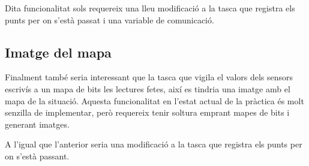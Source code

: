 Dita funcionalitat sols requereix una lleu modificació a la tasca que registra
els punts per on s'està passat i una variable de comunicació.

\subsection{Imatge del mapa}
Finalment també seria interessant que la tasca que vigila el valors dels sensors
escrivís a un mapa de bits les lectures fetes, així es tindria una imatge amb el
mapa de la situació. Aquesta funcionalitat en l'estat actual de la pràctica és
molt senzilla de implementar, però requereix tenir soltura emprant mapes de bits
i generant imatges.

A l'igual que l'anterior seria una modificació a la tasca que registra els
punts per on s'està passant.
